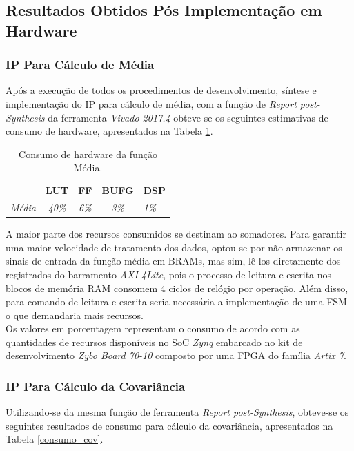 \subsection{Resultados Obtidos Pós Implementação em Hardware}
\subsubsection{IP Para Cálculo de Média}

Após a execução de todos os procedimentos de desenvolvimento, síntese e implementação do IP para cálculo de média, com a função de \textit{Report post-Synthesis} da ferramenta \textit{Vivado 2017.4} obteve-se os seguintes estimativas de consumo de hardware, apresentados na Tabela \ref{consumo_media}.

\begin{table}[!h]
	\centering
	\caption{Consumo de hardware da função Média.}
	\label{consumo_media}
	\begin{tabular}{ccccl}
		\textbf{}         & \textbf{LUT}  & \textbf{FF}  & \textbf{BUFG} & \textbf{DSP} \\
		\textit{Média} & \textit{40\%} & \textit{6\%} & \textit{3\%}  & \textit{1\%}
	\end{tabular}
\end{table}

A maior parte dos recursos consumidos se destinam ao somadores. Para garantir uma maior velocidade de tratamento dos dados, optou-se por não armazenar os sinais de entrada da função média em BRAMs, mas sim, lê-los diretamente dos registrados do barramento \textit{AXI-4Lite}, pois o processo de leitura e escrita nos blocos de memória RAM consomem 4 ciclos de relógio por operação. Além disso, para comando de leitura e escrita seria necessária a implementação de uma FSM o que demandaria mais recursos.\\
Os valores em porcentagem representam o consumo de acordo com as quantidades de recursos disponíveis no SoC \textit{Zynq} embarcado no kit de desenvolvimento \textit{Zybo Board 70-10} composto por uma FPGA do família \textit{Artix 7}.

\subsubsection{IP Para Cálculo da Covariância}
Utilizando-se da mesma função de ferramenta \textit{Report post-Synthesis}, obteve-se os seguintes resultados de consumo para cálculo da covariância, apresentados na Tabela \ref{consumo_cov}.

